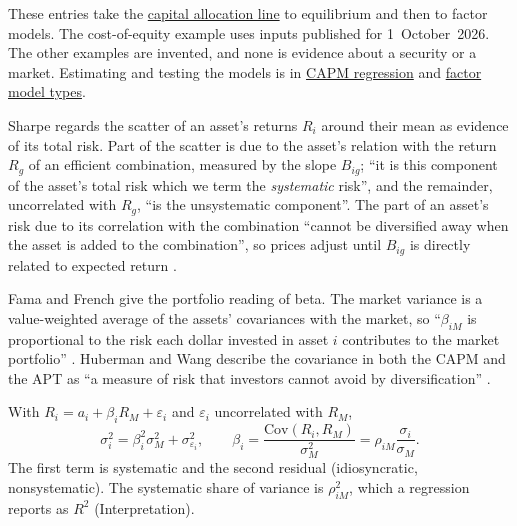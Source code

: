 These entries take the \hyperref[meth:capital-allocation-line]{capital allocation line} to equilibrium and then to factor models. The cost-of-equity example uses inputs published for 1~October~2026. The other examples are invented, and none is evidence about a security or a market. Estimating and testing the models is in \hyperref[meth:capm-regression]{CAPM regression} and \hyperref[def:factor-model-types]{factor model types}.

\begin{qfmechanism}\label{mech:systematic-risk-pricing}
 Sharpe regards the scatter of an asset's returns $R_i$ around their mean as evidence of its total risk. Part of the scatter is due to the asset's relation with the return $R_g$ of an efficient combination, measured by the slope $B_{ig}$; ``it is this component of the asset's total risk which we term the \emph{systematic} risk'', and the remainder, uncorrelated with $R_g$, ``is the unsystematic component''. The part of an asset's risk due to its correlation with the combination ``cannot be diversified away when the asset is added to the combination'', so prices adjust until $B_{ig}$ is directly related to expected return \citep[\emph{Journal of Finance} 19(3), 1964, pp.~438--440 and Fig.~8]{capital-asset-prices-1964}.

Fama and French give the portfolio reading of beta. The market variance is a value-weighted average of the assets' covariances with the market, so ``$\beta_{iM}$ is proportional to the risk each dollar invested in asset $i$ contributes to the market portfolio'' \citep[\emph{JEP} 18(3), 2004, pp.~28--29 and n.~3]{capm-theory-evidence-2004}. Huberman and Wang describe the covariance in both the CAPM and the APT as ``a measure of risk that investors cannot avoid by diversification'' \citep[FRBNY Staff Report 216, August 2005, sec.~1]{arbitrage-pricing-review-2005}.

 With $R_i=a_i+\beta_iR_M+\varepsilon_i$ and $\varepsilon_i$ uncorrelated with $R_M$,
\[ \sigma_i^2=\beta_i^2\sigma_M^2+\sigma_{\varepsilon_i}^2,\qquad \beta_i=\frac{\mathrm{Cov}(R_i,R_M)}{\sigma_M^2}=\rho_{iM}\frac{\sigma_i}{\sigma_M}. \]
The first term is systematic and the second residual (idiosyncratic, nonsystematic). The systematic share of variance is $\rho_{iM}^2$, which a regression reports as $R^2$ (Interpretation).


\end{qfmechanism}
